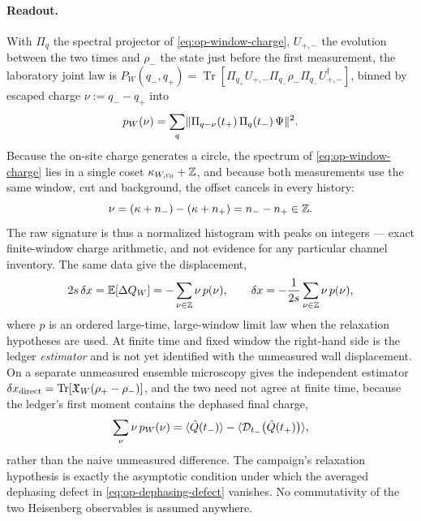 \paragraph{Readout.} With $\Pi_q$ the spectral projector of
\eqref{eq:op-window-charge}, $U_{+,-}$ the evolution between the two times and
$\rho_-$ the state just before the first measurement, the laboratory joint law
is
$P_W(q_-,q_+)=\operatorname{Tr}[\Pi_{q_+}U_{+,-}\Pi_{q_-}\rho_-\Pi_{q_-}U_{+,-}^{\dagger}]$,
binned by escaped charge $\nu:=q_--q_+$ into
\begin{equation}
  p_W(\nu)=\sum_q\lVert \Pi_{q-\nu}(t_+)\,\Pi_q(t_-)\,\Psi\rVert^2 .
  \label{eq:op-escaped-law}
\end{equation}
Because the on-site charge generates a circle, the spectrum of
\eqref{eq:op-window-charge} lies in a single coset $\kappa_{W,c_0}+\mathbb{Z}$, and
because both measurements use the same window, cut and background, the offset
cancels in every history:
\begin{equation}
  \nu=(\kappa+n_-)-(\kappa+n_+)=n_--n_+\in\mathbb{Z} .
  \label{eq:op-integer-support}
\end{equation}
The raw signature is thus a normalized histogram with peaks on integers ---
exact finite-window charge arithmetic, and not evidence for any particular
channel inventory. The same data give the displacement,
\begin{equation}
  2s\,\delta x=\mathbb{E}[\Delta Q_W]=-\sum_{\nu\in\mathbb{Z}}\nu\,p(\nu),
  \qquad
  \delta x=-\frac{1}{2s}\sum_{\nu\in\mathbb{Z}}\nu\,p(\nu),
  \label{eq:op-ledger-displacement}
\end{equation}
where $p$ is an ordered large-time, large-window limit law when the relaxation
hypotheses are used. At finite time and fixed window the right-hand side is the
ledger \emph{estimator} and is not yet identified with the unmeasured wall
displacement. On a separate unmeasured ensemble microscopy gives the
independent estimator
$\delta x_{\mathrm{direct}}=\operatorname{Tr}[\mathfrak{X}_W(\rho_+-\rho_-)]$, and
the two need not agree at finite time, because the ledger's first moment
contains the dephased final charge,
\begin{equation}
  \sum_\nu\nu\,p_W(\nu)
  =\langle \hat{Q}(t_-)\rangle-\langle \mathcal{D}_{t_-}\bigl(\hat{Q}(t_+)\bigr)\rangle,
  \label{eq:op-dephasing-defect}
\end{equation}
rather than the naive unmeasured difference. The campaign's relaxation
hypothesis is exactly the asymptotic condition under which the averaged
dephasing defect in \eqref{eq:op-dephasing-defect} vanishes. No commutativity
of the two Heisenberg observables is assumed anywhere.

